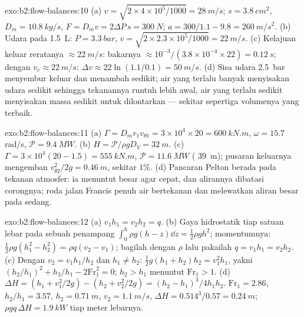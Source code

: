\begin{solution}{exo:b2:flow-balances:10}
(a) $v = \sqrt{2 \times 4 \times 10^5/1000} = \qty{28}{m/s}$; $s = \qty{3.8}{cm^2}$, $D_m =
\qty{10.8}{kg/s}$, $F = D_mv = 2\Delta P\,s = \qty{300}{N}$; $a = 300/1.1 - 9.8 =
\qty{260}{m/s^2}$. (b) Udara pada \qty{1.5}{L}: $P = \qty{3.3}{bar}$, $v = \sqrt{2 \times 2.3 \times
10^5/1000} = \qty{22}{m/s}$. (c) Kelajuan keluar reratanya $\approx \qty{22}{m/s}$: bakarnya $\approx 10^{-3}
/(3.8 \times 10^{-4} \times 22) = \qty{0.12}{s}$;  dengan $v_e \approx \qty{22}{m/s}$:
$\Delta v \approx 22\ln(1.1/0.1) = \qty{50}{m/s}$. (d) Sisa udara \qty{2.5}{bar}
menyembur keluar dan menambah sedikit; air yang terlalu banyak menyisakan udara sedikit sehingga
tekanannya runtuh lebih awal, air yang terlalu sedikit menyisakan massa sedikit untuk dilontarkan ---
sekitar sepertiga volumenya yang terbaik.
\end{solution}

\begin{solution}{exo:b2:flow-balances:11}
(a) $\Gamma = D_mr_1v_{\theta1} = 3 \times 10^4 \times 20 = \qty{600}{kN.m}$, $\omega = 15.7$ rad/s,
$\mathcal P = \qty{9.4}{MW}$. (b) $H = \mathcal P/\rho gD_V = \qty{32}{m}$. (c) $\Gamma = 3 \times
10^4(20 - 1.5) = \qty{555}{kN.m}$, $\mathcal P = \qty{11.6}{MW}$ ( \qty{39}{m});
pusaran keluarnya mengemban $v_{\theta2}^2/2g = \qty{0.46}{m}$, sekitar $1\%$. (d) Pancaran Pelton
berada pada tekanan atmosfer: ia menuntut  besar agar cepat, dan
alirannya dibatasi corongnya; roda jalan Francis penuh air bertekanan
dan melewatkan aliran besar pada  sedang.
\end{solution}

\begin{solution}{exo:b2:flow-balances:12}
(a) $v_1h_1 = v_2h_2 = q$. (b) Gaya hidrostatik tiap satuan lebar pada sebuah
penampang $\int_0^h\rho g(h - z)\dd z = \tfrac12\rho gh^2$; momentumnya: $\tfrac12\rho g(h_1^2
- h_2^2) = \rho q(v_2 - v_1)$; bagilah dengan $\rho$ lalu pakailah $q = v_1h_1 = v_2h_2$.
(c) Dengan $v_2 = v_1h_1/h_2$ dan $h_1 \ne h_2$: $\tfrac12g(h_1 + h_2)h_2 = v_1^2h_1$,
yakni $(h_2/h_1)^2 + h_2/h_1 - 2\mathrm{Fr}_1^2 = 0$; $h_2 > h_1$ menuntut $\mathrm{Fr}_1 > 1$.
(d) $\Delta H = (h_1 + v_1^2/2g) - (h_2 + v_2^2/2g) = (h_2 - h_1)^3/4h_1h_2$.
$\mathrm{Fr}_1 = 2.86$, $h_2/h_1 = 3.57$, $h_2 = \qty{0.71}{m}$, $v_2 = \qty{1.1}{m/s}$,
$\Delta H = 0.514^3/0.57 = \qty{0.24}{m}$; $\rho gq\,\Delta H = \qty{1.9}{kW}$ tiap meter
lebarnya.
\end{solution}

